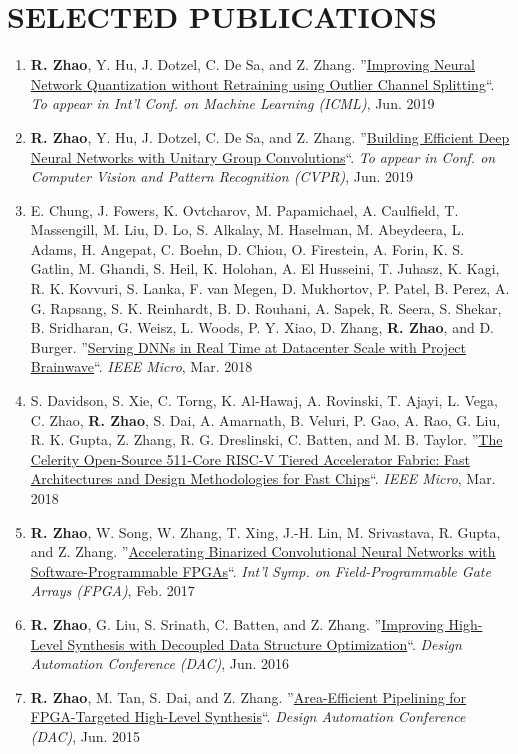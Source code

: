 \documentclass[11pt,a4paper,roman]{moderncv}        %
\newcommand{\BF}[1]{\textbf{#1}}
\newcommand{\IT}[1]{\textit{#1}}
\newcommand{\UL}[1]{\uline{#1}}
\newcommand*{\customcvpub}[5][.5em]{
  {#2 ''\UL{#3}``. \IT{#4}, #5}
  \par\addvspace{#1}
}
\begin{document}
\section{SELECTED PUBLICATIONS}
\vspace{1mm}
\begin{minipage}{\maincolumnwidth}%
	\small{
	\begin{enumerate}
	      \item \customcvpub{\BF{R. Zhao}, Y. Hu, J. Dotzel, C. De Sa, and Z. Zhang.}{Improving Neural Network Quantization without Retraining using Outlier Channel Splitting}{To appear in Int'l Conf. on Machine Learning (ICML)}{Jun. 2019}
    	  \item \customcvpub{\BF{R. Zhao}, Y. Hu, J. Dotzel, C. De Sa, and Z. Zhang.}{Building Efficient Deep Neural Networks with Unitary Group Convolutions}{To appear in Conf. on Computer Vision and Pattern Recognition (CVPR)}{Jun. 2019}
        \item \customcvpub{E. Chung, J. Fowers, K. Ovtcharov, M. Papamichael, A. Caulfield, T. Massengill, M. Liu, D. Lo, S. Alkalay, M. Haselman, M. Abeydeera, L. Adams, H. Angepat, C. Boehn, D. Chiou, O. Firestein, A. Forin, K. S. Gatlin, M. Ghandi, S. Heil, K. Holohan, A. El Husseini, T. Juhasz, K. Kagi, R. K. Kovvuri, S. Lanka, F. van Megen, D. Mukhortov, P. Patel, B. Perez, A. G. Rapsang, S. K. Reinhardt, B. D. Rouhani, A. Sapek, R. Seera, S. Shekar, B. Sridharan, G. Weisz, L. Woods, P. Y. Xiao, D. Zhang, \BF{R. Zhao}, and D. Burger.}{Serving DNNs in Real Time at Datacenter Scale with Project Brainwave}{IEEE Micro}{Mar. 2018}
        \item \customcvpub{S. Davidson, S. Xie, C. Torng, K. Al-Hawaj, A. Rovinski, T. Ajayi, L. Vega, C. Zhao, \BF{R. Zhao}, S. Dai, A. Amarnath, B. Veluri, P. Gao, A. Rao, G. Liu, R. K. Gupta, Z. Zhang, R. G. Dreslinski, C. Batten, and M. B. Taylor.}{The Celerity Open-Source 511-Core RISC-V Tiered Accelerator Fabric: Fast Architectures and Design Methodologies for Fast Chips}{IEEE Micro}{Mar. 2018}
        \item \customcvpub{\BF{R. Zhao}, W. Song, W. Zhang, T. Xing, J.-H. Lin, M. Srivastava, R. Gupta, and Z. Zhang.}{Accelerating Binarized Convolutional Neural Networks with Software-Programmable FPGAs}{Int’l Symp. on Field-Programmable Gate Arrays (FPGA)}{Feb. 2017}
        \item \customcvpub{\BF{R. Zhao}, G. Liu, S. Srinath, C. Batten, and Z. Zhang.}{Improving High-Level Synthesis with Decoupled Data Structure Optimization}{Design Automation Conference (DAC)}{Jun. 2016}
        \item \customcvpub{\BF{R. Zhao}, M. Tan, S. Dai, and Z. Zhang.}{Area-Efficient Pipelining for FPGA-Targeted High-Level Synthesis}{Design Automation Conference (DAC)}{Jun. 2015}
    \end{enumerate}
    }
\end{minipage}%
\end{document}
